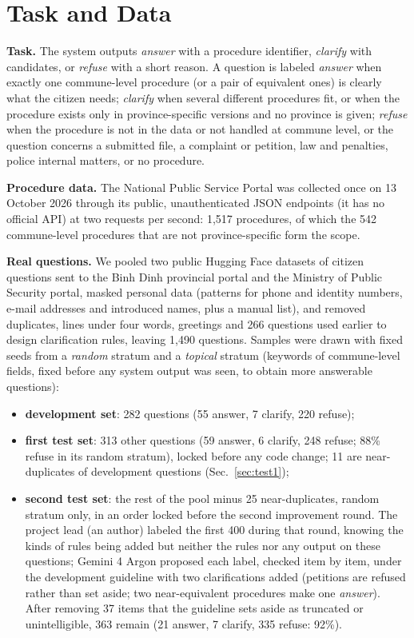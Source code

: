 \section{Task and Data}\label{sec:data}

\textbf{Task.} The system outputs \emph{answer} with a procedure identifier, \emph{clarify} with candidates, or \emph{refuse} with a short
reason. A question is labeled \emph{answer} when exactly one commune-level procedure (or a pair of equivalent ones) is clearly what the
citizen needs; \emph{clarify} when several different procedures fit, or when the procedure exists only in province-specific versions and no
province is given; \emph{refuse} when the procedure is not in the data or not handled at commune level, or the question concerns a submitted
file, a complaint or petition, law and penalties, police internal matters, or no procedure.

\textbf{Procedure data.} The National Public Service Portal\cite{dvcportal} was collected once on 13 October 2026 through its public,
unauthenticated JSON endpoints (it has no official API) at two requests per second: 1,517 procedures, of which the 542 commune-level
procedures that are not province-specific form the scope.

\textbf{Real questions.} We pooled two public Hugging Face datasets of citizen questions sent to the Binh Dinh provincial
portal\cite{hfdvc} and the Ministry of Public Security portal\cite{hfmps}, masked personal data (patterns for phone and identity numbers,
e-mail addresses and introduced names, plus a manual list), and removed duplicates, lines under four words, greetings and 266 questions used earlier
to design clarification rules, leaving 1,490 questions. Samples were drawn with fixed seeds from a \emph{random} stratum and a
\emph{topical} stratum (keywords of commune-level fields, fixed before any system output was seen, to obtain more answerable questions):
\begin{itemize}
\item \textbf{development set}: 282 questions (55 answer, 7 clarify, 220 refuse);
\item \textbf{first test set}: 313 other questions (59 answer, 6 clarify, 248 refuse; 88\% refuse in its random stratum), locked before any
code change; 11 are near-duplicates of development questions (Sec.~\ref{sec:test1});
\item \textbf{second test set}: the rest of the pool minus 25 near-duplicates, random stratum only, in an order locked before the second
improvement round. The project lead (an author) labeled the first 400 during that round, knowing the kinds of rules being added but
neither the rules nor any output on these questions; Gemini 4 Argon proposed each label, checked item by item, under the development guideline
with two clarifications added (petitions are refused rather than set aside; two near-equivalent procedures make one \emph{answer}).
After removing 37 items that the guideline sets aside as truncated or unintelligible, 363 remain (21 answer, 7 clarify, 335 refuse: 92\%).
\end{itemize}

